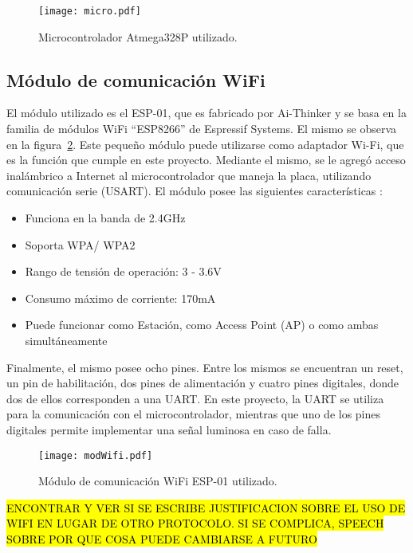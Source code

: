 \begin{figure}[H]
	\centering
	\texttt{[image: micro.pdf]}
	\caption{Microcontrolador Atmega328P utilizado.}
	\label{fig:img_micro}
\end{figure}


\subsection{Módulo de comunicación WiFi}

El módulo utilizado es el ESP-01, que es fabricado por Ai-Thinker y se basa en la familia de módulos WiFi “ESP8266” de Espressif Systems. El mismo se observa en la figura~\ref{fig:img_modWifi}. Este pequeño módulo puede utilizarse como adaptador Wi-Fi, que es la función que cumple en este proyecto. Mediante el mismo, se le agregó acceso inalámbrico a Internet al microcontrolador que maneja la placa, utilizando comunicación serie (USART). El módulo posee las siguientes características \cite{modwifi}:
\begin{itemize}
	\item Funciona en la banda de 2.4GHz
	\item Soporta WPA/ WPA2
	\item Rango de tensión de operación: 3 - 3.6V
	\item Consumo máximo de corriente: 170mA
	\item Puede funcionar como Estación, como Access Point (AP) o como ambas simultáneamente
\end{itemize}

Finalmente, el mismo posee ocho pines. Entre los mismos se encuentran un reset, un pin de habilitación, dos pines de alimentación y cuatro pines digitales, donde dos de ellos corresponden a una UART. En este proyecto, la UART se utiliza para la comunicación con el microcontrolador, mientras que uno de los pines digitales permite implementar una señal luminosa en caso de falla.
\begin{figure}[H]
	\centering
	\texttt{[image: modWifi.pdf]}
	\caption{Módulo de comunicación  WiFi ESP-01 utilizado.}
	\label{fig:img_modWifi}
\end{figure}

\hl{ENCONTRAR Y VER SI SE ESCRIBE JUSTIFICACION SOBRE EL USO DE WIFI EN LUGAR DE OTRO PROTOCOLO. SI SE COMPLICA, SPEECH SOBRE POR QUE COSA PUEDE CAMBIARSE A FUTURO}


